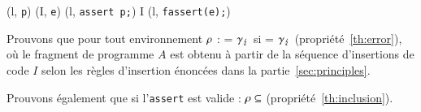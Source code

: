 \begin{center}
{
  {(l, \mbox{\lstinline'p'})  (I, \mbox{\lstinline'e'})}
  {(l, \mbox{\lstinline'assert p;'})
     I \concat (l, \mbox{\lstinline'fassert(e);'})}{}
}
\end{center}

Prouvons que pour tout environnement $\rho${} :
 = $\gamma_\lightning$
si  = $\gamma_\lightning$
(propriété~\ref{th:error}),
où le fragment de programme $A$ est obtenu à partir de la séquence d'insertions
de code $I$ selon les règles d'insertion énoncées dans la
partie~\ref{sec:principles}.

Prouvons également que si l'\lstinline'assert' est valide :
$\rho \subseteq$ 
(propriété~\ref{th:inclusion}).


